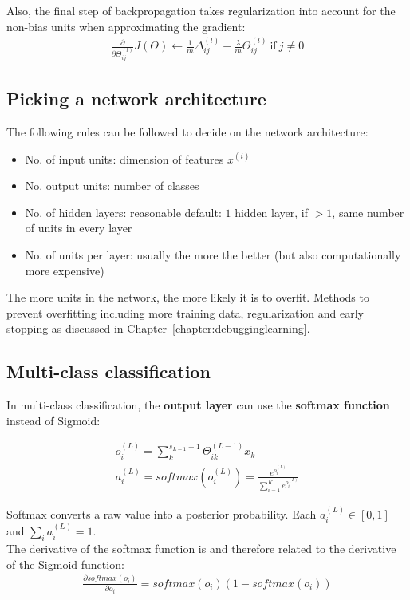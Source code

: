 \documentclass{report}
\begin{document}
Also, the final step of backpropagation takes regularization into account for the non-bias units when approximating the gradient:
\begin{align*}
\frac{\partial}{\partial \Theta_{ij}^{(l)}}J(\Theta) \gets \frac{1}{m}\Delta_{ij}^{(l)}+\frac{\lambda}{m}\Theta_{ij}^{(l)}\:\mbox{if}\:j\ne0
\end{align*}


\subsection{Picking a network architecture}
The following rules can be followed to decide on the network architecture:
\begin{itemize}
\item No. of input units: dimension of features $x^{(i)}$
\item No. output units: number of classes
\item No. of hidden layers: reasonable default: $1$ hidden layer, if $>1$, same number of units in every layer
\item No. of units per layer: usually the more the better (but also computationally more expensive)
\end{itemize}
The more units in the network, the more likely it is to overfit.
Methods to prevent overfitting including more training data, regularization and early stopping as discussed in Chapter~\ref{chapter:debugginglearning}.


\subsection{Multi-class classification}
In multi-class classification, the {\bf output layer} can use the {\bf softmax function} instead of Sigmoid:

\begin{align*}
o_i^{(L)} = \sum_k^{s_{L-1}+1} \Theta_{ik}^{(L-1)}x_k \\
a_i^{(L)} = softmax(o_i^{(L)}) = \frac{e^{o_i^{(L)}}}{\sum_{i=1}^{K} e^{o_i^{(L)}}}
\end{align*}

Softmax converts a raw value into a posterior probability.
Each $a_i^{(L)} \in [0,1]$ and $\sum_i a_i^{(L)} = 1$.\\
The derivative of the softmax function is and therefore related to the derivative of the Sigmoid function:
\begin{align*}
\frac{\partial softmax(o_i)}{\partial o_i} = softmax(o_i)(1-softmax(o_i))
\end{align*}
\end{document}
